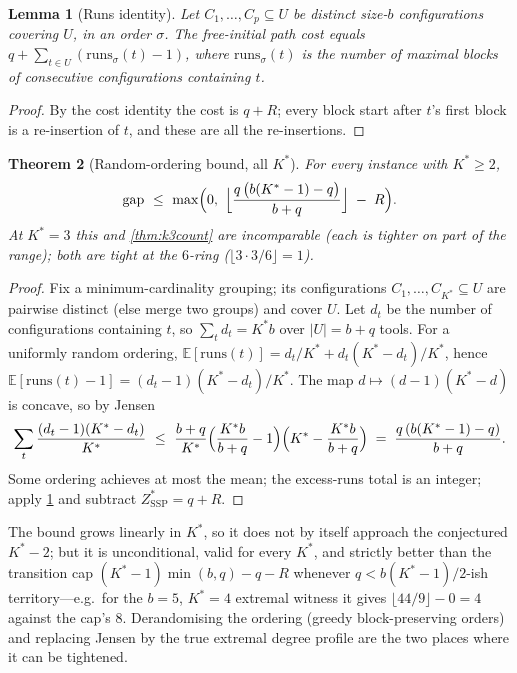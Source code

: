 \documentclass[11pt,a4paper]{article}
\theoremstyle{plain}
\newtheorem{theorem}{Theorem}[section]
\newtheorem{lemma}[theorem]{Lemma}
\theoremstyle{definition}
\newcommand{\Kstar}{K^{*}}
\newcommand{\ZSSP}{Z_{\mathrm{SSP}}^{*}}
\begin{document}
\begin{thmbox}
\begin{lemma}[Runs identity]
\label{lem:runs}
Let $C_1,\dots,C_p\subseteq U$ be distinct size-$b$ configurations covering $U$,
in an order $\sigma$. The free-initial path cost equals
$q+\sum_{t\in U}(\mathrm{runs}_\sigma(t)-1)$, where $\mathrm{runs}_\sigma(t)$ is
the number of maximal blocks of consecutive configurations containing $t$.
\end{lemma}
\end{thmbox}
\begin{proofbox}
\begin{proof}
By the cost identity the cost is $q+R$; every block start after $t$'s first
block is a re-insertion of $t$, and these are all the re-insertions.
\end{proof}
\end{proofbox}

\begin{thmbox}
\begin{theorem}[Random-ordering bound, all $\Kstar$]
\label{thm:genk}
For every instance with $\Kstar\ge2$,
\[
  \mathrm{gap}\ \le\ \max\Bigl(0,\
  \Bigl\lfloor\frac{q\,\bigl(b(\Kstar-1)-q\bigr)}{b+q}\Bigr\rfloor
  \;-\;R\Bigr).
\]
At $\Kstar=3$ this and \cref{thm:k3count} are incomparable (each is tighter on
part of the range); both are tight at the $6$-ring ($\lfloor 3\cdot3/6\rfloor=1$).
\end{theorem}
\end{thmbox}
\begin{proofbox}
\begin{proof}
Fix a minimum-cardinality grouping; its configurations
$C_1,\dots,C_{\Kstar}\subseteq U$ are pairwise distinct (else merge two groups)
and cover $U$. Let $d_t$ be the number of configurations containing $t$, so
$\sum_t d_t=\Kstar b$ over $|U|=b+q$ tools. For a uniformly random ordering,
$\mathbb{E}[\mathrm{runs}(t)]=d_t/\Kstar+d_t(\Kstar-d_t)/\Kstar$, hence
$\mathbb{E}[\mathrm{runs}(t)-1]=(d_t-1)(\Kstar-d_t)/\Kstar$. The map
$d\mapsto(d-1)(\Kstar-d)$ is concave, so by Jensen
\[
  \sum_t\frac{(d_t-1)(\Kstar-d_t)}{\Kstar}\ \le\
  \frac{b+q}{\Kstar}\Bigl(\frac{\Kstar b}{b+q}-1\Bigr)
  \Bigl(\Kstar-\frac{\Kstar b}{b+q}\Bigr)
  \;=\;\frac{q\,(b(\Kstar-1)-q)}{b+q}.
\]
Some ordering achieves at most the mean; the excess-runs total is an integer;
apply \cref{lem:runs} and subtract $\ZSSP=q+R$.
\end{proof}
\end{proofbox}

\noindent The bound grows linearly in $\Kstar$, so it does not by itself
approach the conjectured $\Kstar-2$; but it is unconditional, valid for every
$\Kstar$, and strictly better than the transition cap
$(\Kstar-1)\min(b,q)-q-R$ whenever $q<b(\Kstar-1)/2$-ish territory---e.g.\ for
the $b=5$, $\Kstar=4$ extremal witness it gives $\lfloor44/9\rfloor-0=4$
against the cap's $8$. Derandomising the ordering (greedy block-preserving
orders) and replacing Jensen by the true extremal degree profile are the two
places where it can be tightened.
\end{document}

